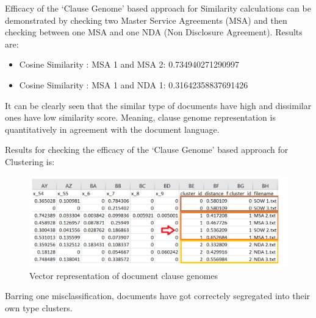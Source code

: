 \documentclass[9pt,academicons]{article}
\begin{document}
Efficacy of the `Clause Genome' based approach for Similarity calculations can be demonstrated by checking two Master Service Agreements (MSA) and then checking between one MSA and one NDA (Non Disclosure Agreement). Results are:

 \begin{itemize}
 \item Cosine Similarity : MSA 1 and MSA 2: 0.734940271290997 
\item Cosine Similarity : MSA 1 and NDA 1: 0.31642358837691426 
\end{itemize}

It can be clearly seen that the similar type of documents have high and dissimilar ones have low similarity score. Meaning, clause genome
representation is quantitatively in agreement with the document language.

Results for checking the efficacy of the `Clause Genome' based approach for Clustering is:

 \begin{figure}[h!]
 \begin{center}
  \includegraphics[width=\textwidth]{img/genomeclustering.png}
  \caption{Vector representation of document clause genomes}
  \label{fig:genomeclustering}
 \end{center}
 \end{figure}
 

Barring one misclassification, documents have got correctely segregated into their own type
clusters.

\end{document}
